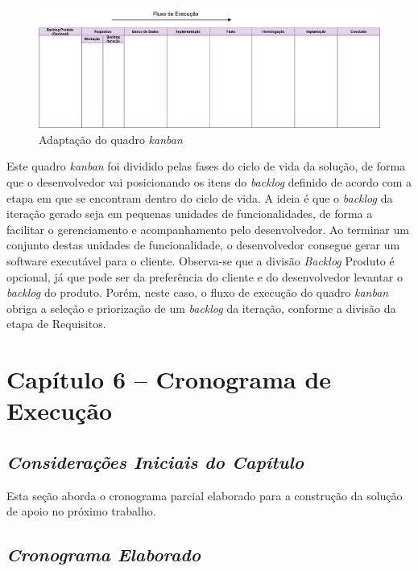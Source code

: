 \begin{landscape}
\vspace*{3cm}
\begin{figure}[!htb]
	\centering
		\includegraphics[scale=0.35]{figuras/kanban}
	\caption{Adaptação do quadro \textit{kanban}}
\end{figure}
\end{landscape}

Este quadro \textit{kanban} foi dividido pelas fases do ciclo de vida da solução, de forma que o desenvolvedor vai posicionando os itens do \textit{backlog} definido de acordo com a etapa em que se encontram dentro do ciclo de vida. A ideia é que o \textit{backlog} da iteração gerado seja em pequenas unidades de funcionalidades, de forma a facilitar o gerenciamento e acompanhamento pelo desenvolvedor. Ao terminar um conjunto destas unidades de funcionalidade, o desenvolvedor consegue gerar um software executável para o cliente. Observa-se que a divisão \textit{Backlog} Produto é opcional, já que pode ser da preferência do cliente e do desenvolvedor levantar o \textit{backlog} do produto. Porém, neste caso, o fluxo de execução do quadro \textit{kanban} obriga a seleção e priorização de um \textit{backlog} da iteração, conforme a divisão da etapa de Requisitos.

\chapter[Capítulo 6 – Cronograma de Execução]{Capítulo 6 – Cronograma de Execução}

\section{\textit{Considerações Iniciais do Capítulo}}

Esta seção aborda o cronograma parcial elaborado para a construção da solução de apoio no próximo trabalho.

\section{\textit{Cronograma Elaborado}}

